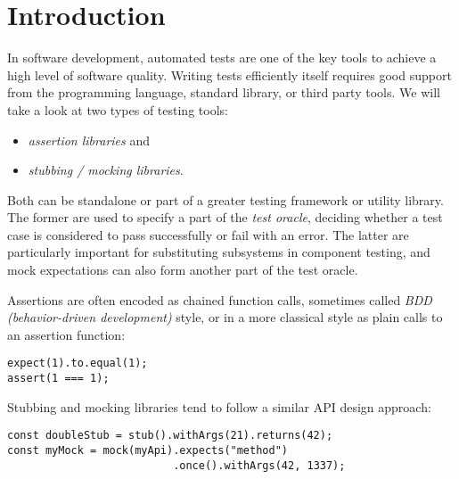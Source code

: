 \chapter{Introduction}
In software development, automated tests are one of the key tools
to achieve a high level of software quality.
Writing tests efficiently itself requires good support
from the programming language, standard library, or third party tools.
We will take a look at two types of testing tools:
\begin{itemize}
  \item \textit{assertion libraries} and
  \item \textit{stubbing / mocking libraries}.
\end{itemize}
Both can be standalone or part of a greater testing framework or utility library.
The former are used to specify a part of the \textit{test oracle},
deciding whether a test case is considered to pass successfully or fail with an error.
The latter are particularly important for substituting subsystems in component testing,
and mock expectations can also form another part of the test oracle.

Assertions are often encoded as chained function calls,
sometimes called \textit{BDD (behavior-driven development)} style,
or in a more classical style as plain calls to an assertion function:
\autocite{ChaiBddDoc}\autocite{ChaiTddDoc}
\begin{verbatim}
expect(1).to.equal(1);
assert(1 === 1);
\end{verbatim}
Stubbing and mocking libraries tend to follow a similar API design approach:
\autocite{SinonStubDoc}\autocite{SinonMockDoc}
\begin{verbatim}
const doubleStub = stub().withArgs(21).returns(42);
const myMock = mock(myApi).expects("method")
                          .once().withArgs(42, 1337);
\end{verbatim}
